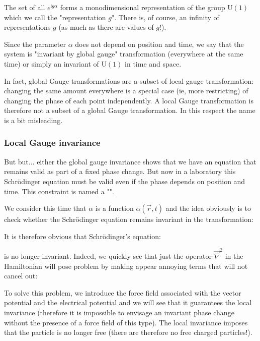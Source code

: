 	The set of all $e^{\mathrm{i}g\alpha}$ forms a monodimensional representation of the group $\text{U}(1)$ which we call the "representation $g$". There is, of course, an infinity of representations $g$ (as much as there are values of $g$!).
	
	Since the parameter $\alpha$ does not depend on position and time, we say that the system is "invariant by global gauge" transformation (everywhere at the same time) or simply an invariant of $\text{U}(1)$ in time and space.
	
	\begin{tcolorbox}[title=Remark,colframe=black,arc=10pt]
	In fact, global Gauge transformations are a subset of local gauge transformation: changing the same amount everywhere is a special case (ie, more restricting) of changing the phase of each point independently. A local Gauge transformation is therefore not a subset of a global Gauge transformation. In this respect the name is a bit misleading.
	\end{tcolorbox}
	
	\pagebreak
	\subsubsection{Local Gauge invariance}
	But but... either the global gauge invariance shows that we have an equation that remains valid as part of a fixed phase change. But now in a laboratory this Schrödinger equation must be valid even if the phase depends on position and time. This constraint is named a "".

	We consider this time that $\alpha$ is a function $\alpha(\vec{r},t)$ and the idea obviously is to check whether the Schrödinger equation remains invariant in the transformation:
	
	It is therefore obvious that Schrödinger's equation:
	
	is no longer invariant. Indeed, we quickly see that just the operator $\vec{\nabla}^2$ in the Hamiltonian will pose problem by making appear annoying terms that will not cancel out:
	
	To solve this problem, we introduce the force field associated with the vector potential and the electrical potential and we will see that it guarantees the local invariance (therefore it is impossible to envisage an invariant phase change without the presence of a force field of this type). The local invariance imposes that the particle is no longer free (there are therefore no free charged particles!).

